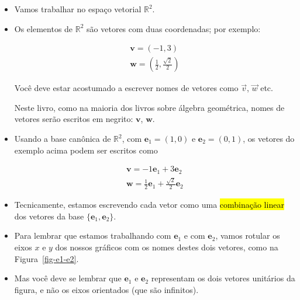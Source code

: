 \documentclass[
  letterpaper,
  DIV=11,
  numbers=noendperiod]{scrreprt}
\begin{document}
\begin{itemize}
\item
  Vamos trabalhar no espaço vetorial $\mathbb{R}^2$.
\item
  Os elementos de $\mathbb{R}^2$ são vetores com duas coordenadas; por
  exemplo:

  \[
  \begin{array}{l}
    \mathbf{v} = (-1, 3)\\
    \mathbf{w} = \left( \frac12, \frac{\sqrt{2}}{2} \right)
  \end{array}
  \]

  \begin{tcolorbox}[standard jigsaw,titlerule=0mm, bottomtitle=1mm, coltitle=black, colbacktitle=quarto-callout-warning-color!10!white, left=2mm, toptitle=1mm, arc=.35mm, title=\textcolor{quarto-callout-warning-color}{\faExclamationTriangle}\hspace{0.5em}{Notação: vetores em negrito}, rightrule=.15mm, bottomrule=.15mm, colframe=quarto-callout-warning-color-frame, opacitybacktitle=0.6, opacityback=0, colback=white, leftrule=.75mm, toprule=.15mm]
  Você deve estar acostumado a escrever nomes de vetores como $\vec v$,
  $\vec w$ etc.

  Neste livro, como na maioria dos livros sobre álgebra geométrica,
  nomes de vetores serão escritos em negrito: $\mathbf{v}$,
  $\mathbf{w}$.
  \end{tcolorbox}
\item
  Usando a base canônica de $\mathbb{R}^2$, com
  $\mathbf{e}_{1} = (1, 0)$ e $\mathbf{e}_{2} = (0, 1)$, os vetores do
  exemplo acima podem ser escritos como

  \[
  \begin{array}{l}
    \mathbf{v} = -1\mathbf{e}_{1} + 3\mathbf{e}_{2}\\
    \mathbf{w} = \frac12 \mathbf{e}_{1} + \frac{\sqrt{2}}{2}\mathbf{e}_{2}
  \end{array}
  \]
\item
  Tecnicamente, estamos escrevendo cada vetor como uma {\hl{combinação
  linear}} dos vetores da base $\{ \mathbf{e}_{1}, \mathbf{e}_{2} \}$.
\item
  Para lembrar que estamos trabalhando com $\mathbf{e}_{1}$ e com
  $\mathbf{e}_{2}$, vamos rotular os eixos $x$ e $y$ dos nossos gráficos
  com os nomes destes dois vetores, como na Figura~\ref{fig-e1-e2}.
\item
  Mas você deve se lembrar que $\mathbf{e}_{1}$ e $\mathbf{e}_{2}$
  representam os dois vetores unitários da figura, e não os eixos
  orientados (que são infinitos).


\end{itemize}
\end{document}

